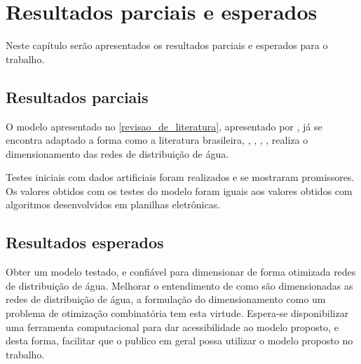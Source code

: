 \documentclass[
	12pt,				%
	openright,			%
	twoside,			%
	a4paper,			%
	english,			%
	french,				%
	spanish,			%
	brazil				%
	]{abntex2}
\begin{document}
\chapter{Resultados parciais e esperados}

Neste capítulo serão apresentados os resultados parciais e esperados para o trabalho.

\section{Resultados parciais}

O modelo apresentado no \autoref{revisao_de_literatura}, apresentado por \cite{bragalli2012}, já se encontra adaptado a forma como a literatura brasileira, , , , , realiza o dimensionamento das redes de distribuição de água.

Testes iniciais com dados artificiais foram realizados e se mostraram promissores. Os valores obtidos com os testes do modelo foram iguais aos valores obtidos com algoritmos desenvolvidos em planilhas eletrônicas.


\section{Resultados esperados}

Obter um modelo testado, e confiável para dimensionar de forma otimizada redes de distribuição de água.
Melhorar o entendimento de como são dimensionadas as redes de distribuição de água, a formulação do dimensionamento como um problema de otimização combinatória tem esta virtude.
Espera-se disponibilizar uma ferramenta computacional para dar acessibilidade ao modelo proposto, e desta forma, facilitar que o publico em geral possa utilizar o modelo proposto no trabalho.




 






\end{document}
